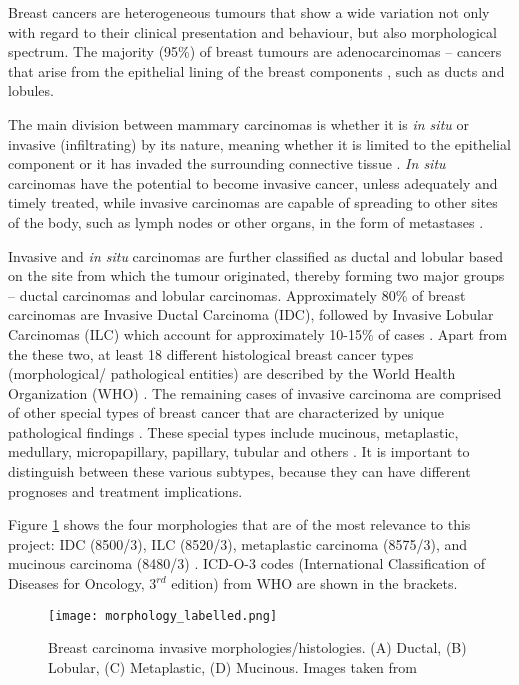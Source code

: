    
   Breast cancers are heterogeneous tumours that show a wide variation not only with regard to their clinical presentation and behaviour, but also morphological spectrum. The majority (95\%) of breast tumours are adenocarcinomas -- cancers that arise from the epithelial lining of the breast components \cite{Makki2015DiversityRelevance}, such as ducts and lobules.

    The main division between mammary carcinomas is whether it is \textit{in situ} or invasive (infiltrating) by its nature, meaning whether it is limited to the epithelial component or it has invaded the surrounding connective tissue \cite{Weigelt2008RefinementTypes}. \textit{In situ} carcinomas have the potential to become invasive cancer, unless adequately and timely treated, while invasive carcinomas are capable of spreading to other sites of the body, such as lymph nodes or other organs, in the form of metastases \cite{Makki2015DiversityRelevance}.

    Invasive and \textit{in situ} carcinomas are further classified as ductal and lobular based on the site from which the tumour originated, thereby forming two major groups --  ductal carcinomas and lobular carcinomas. Approximately 80\% of breast carcinomas are Invasive Ductal Carcinoma (IDC), followed by Invasive Lobular Carcinomas (ILC) which account for approximately 10-15\% of cases \cite{Weigelt2008RefinementTypes}. Apart from the these two, at least 18 different histological breast cancer types (morphological/ pathological entities) are described by the World Health Organization (WHO) \cite{walker2005world, 2011InternationalEd.}. The remaining cases of invasive carcinoma are comprised of other special types of breast cancer that are characterized by unique pathological findings \cite{Makki2015DiversityRelevance}. These special types include mucinous, metaplastic, medullary, micropapillary, papillary, tubular and others \cite{Weigelt2008RefinementTypes}. It is important to distinguish between these various subtypes, because they can have different prognoses and treatment implications.

    Figure \ref{fig:histology} shows the four morphologies that are of the most relevance to this project: IDC (8500/3), ILC (8520/3), metaplastic carcinoma (8575/3), and mucinous carcinoma (8480/3) \cite{Gathani2005BreastProgramme}. ICD-O-3 codes (International Classification of Diseases for Oncology, $3^{rd}$ edition) from WHO are shown in the brackets. 

   
            \begin{figure}[!h]
            \centering
            \texttt{[image: morphology\_labelled.png]}
            \caption{Breast carcinoma invasive morphologies/histologies. (A) Ductal, (B) Lobular, (C) Metaplastic, (D) Mucinous. Images taken from \cite{Ramnani2016Webpathology.com:Images, Abdelmessieh2016BreastOverview}}
            \label{fig:histology}
            \end{figure} 
    
